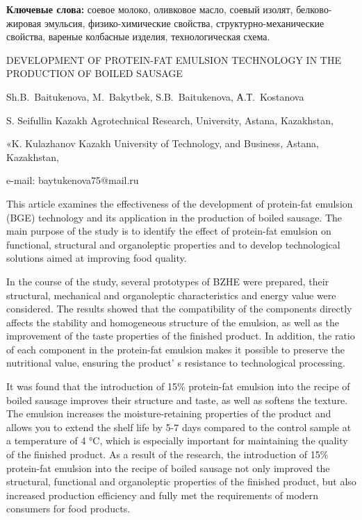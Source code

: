 {\bfseries Ключевые слова:} соевое молоко, оливковое масло, соевый изолят,
белково-жировая эмульсия, физико-химические свойства,
структурно-механические свойства, вареные колбасные изделия,
технологическая схема.

\begin{header}
DEVELOPMENT OF PROTEIN-FAT EMULSION TECHNOLOGY IN THE PRODUCTION OF BOILED SAUSAGE

Sh.B.~Baitukenova\envelope,
M.~Bakytbek,
S.B.~Baitukenova,
А.Т.~Kostanova
\end{header}

\begin{affil}
S. Seifullin Kazakh Agrotechnical Research, University, Astana, Kazakhstan,

«K. Kulazhanov Kazakh University of Technology, and Business, Astana, Kazakhstan,

e-mail: baytukenova75@mail.ru
\end{affil}

This article examines the effectiveness of the development of
protein-fat emulsion (BGE) technology and its application in the
production of boiled sausage. The main purpose of the study is to
identify the effect of protein-fat emulsion on functional, structural
and organoleptic properties and to develop technological solutions aimed
at improving food quality.

In the course of the study, several prototypes of BZHE were prepared,
their structural, mechanical and organoleptic characteristics and energy
value were considered. The results showed that the compatibility of the
components directly affects the stability and homogeneous structure of
the emulsion, as well as the improvement of the taste properties of the
finished product. In addition, the ratio of each component in the
protein-fat emulsion makes it possible to preserve the nutritional
value, ensuring the product' s resistance to
technological processing.

It was found that the introduction of 15\% protein-fat emulsion into the
recipe of boiled sausage improves their structure and taste, as well as
softens the texture. The emulsion increases the moisture-retaining
properties of the product and allows you to extend the shelf life by 5-7
days compared to the control sample at a temperature of 4 °C, which is
especially important for maintaining the quality of the finished
product. As a result of the research, the introduction of 15\%
protein-fat emulsion into the recipe of boiled sausage not only improved
the structural, functional and organoleptic properties of the finished
product, but also increased production efficiency and fully met the
requirements of modern consumers for food products.

